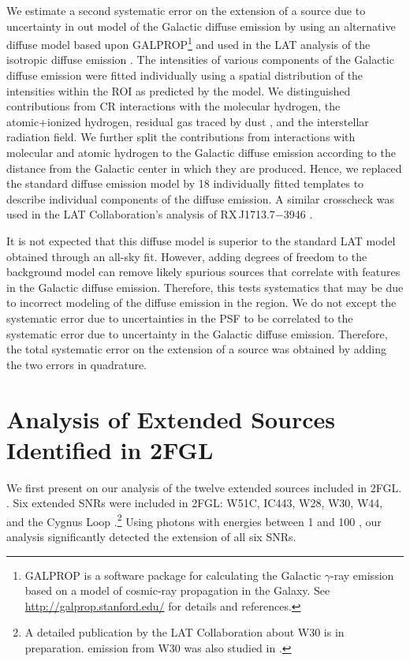 \documentclass[12pt,preprint]{aastex}
\newcommand{\gev}{\text{GeV}\xspace}
\begin{document}

We estimate a second systematic error on the extension of a source
due to uncertainty in out model of the Galactic diffuse emission by
using an alternative diffuse model based
upon GALPROP\footnote{GALPROP is a software package for calculating the
Galactic $\gamma$-ray emission based on a model of cosmic-ray propagation
in the Galaxy. See \url{http://galprop.stanford.edu/} for details
and references.} and used in the LAT analysis of the isotropic diffuse
emission \citep{isotropic_lat}.  The intensities of various components
of the Galactic diffuse emission were fitted individually using a
spatial distribution of the intensities within the ROI as predicted by
the model.  We distinguished contributions from CR interactions with the
molecular hydrogen, the atomic+ionized hydrogen, residual gas traced
by dust \citep{isabelle_dark_gass}, and the interstellar radiation
field. We further split the contributions from interactions with molecular
and atomic hydrogen to the Galactic diffuse emission according to the
distance from the Galactic center in which they are produced. Hence, we
replaced the standard diffuse emission model by 18 individually fitted
templates to describe individual components of the diffuse emission.
A similar crosscheck was used in the LAT Collaboration's analysis of 
RX\,J1713.7$-$3946 \citep{rx_j1713_lat}.

It is not expected that this diffuse model is superior to the standard
LAT model obtained through an all-sky fit.  However, adding degrees of
freedom to the background model can remove likely spurious sources that
correlate with features in the Galactic diffuse emission.  Therefore,
this tests systematics that may be due to incorrect modeling of the
diffuse emission in the region.  We do not except the systematic error
due to uncertainties in the PSF to be correlated to the systematic
error due to uncertainty in the Galactic diffuse emission. Therefore,
the total systematic error on the extension of a source was obtained by
adding the two errors in quadrature.

\section{Analysis of Extended Sources Identified in 2FGL}
\label{validate_known}


We first present on our analysis of the twelve extended sources
included in 2FGL.  \citep{second_cat}.  Six extended SNRs were
included in 2FGL: W51C, IC443, W28, W30, W44, and the Cygnus Loop
\citep{w51c,ic443,w28,w44,cygnus_loop_lat}.\footnote{A detailed
publication by the LAT Collaboration about W30 is in preparation.
\gev emission from W30 was also studied in \cite{castro_and_slane_2010}.
}
Using photons
with energies between
1 \gev and 100 \gev, our analysis significantly detected
the extension of all six SNRs.
\end{document}
